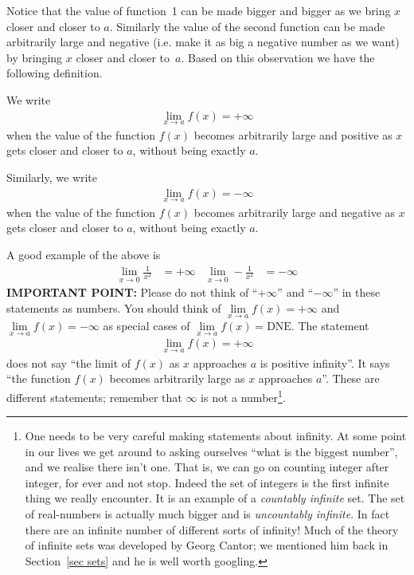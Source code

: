 Notice that the value of function~1 can be made bigger and bigger as we bring
$x$ closer and closer to $a$. Similarly the value of the second function can be
made arbitrarily large and negative (i.e. make it as big a negative number as we
want) by bringing $x$ closer and closer to~$a$. Based on this observation we
have the following definition.
\begin{defn}
\label{def lim is inf informal}
  We write
 \begin{align*}
  \lim_{x \to a} f(x) = + \infty
 \end{align*}
  when the value of the function $f(x)$ becomes arbitrarily large and
  positive as $x$ gets closer and closer to $a$, without being exactly $a$.

  Similarly, we write
 \begin{align*}
  \lim_{x \to a} f(x) = - \infty
 \end{align*}
  when the value of the function $f(x)$ becomes arbitrarily large and
  negative as $x$ gets closer and closer to $a$, without being exactly $a$.
\end{defn}
A good example of the above is
\begin{align*}
  \lim_{x \to 0} \frac{1}{x^2} &= +\infty
  & \lim_{x \to 0} -\frac{1}{x^2} &= -\infty
\end{align*}
\textbf{IMPORTANT POINT: } Please do not think of ``$+\infty$'' and ``$-\infty$''
in these statements as numbers. You should think of $\lim\limits_{x\rightarrow a} f(x) = +\infty$ and $\lim\limits_{x\rightarrow a} f(x) = -\infty$
as special cases of  $\lim\limits_{x\rightarrow a} f(x) = \text{DNE}$. The statement
\begin{align*}
  \lim_{x \to a} f(x) = +\infty
\end{align*}
does not say ``the limit of $f(x)$ as $x$ approaches $a$ is positive infinity''.
It says ``the function $f(x)$ becomes arbitrarily large as $x$ approaches $a$''.
These are different statements; remember that $\infty$ is not a
number\footnote{One needs to be very careful making statements about
infinity. At some point in our lives we get around to asking ourselves ``what
is the biggest number'', and we realise there isn't one. That is, we can go on
counting integer after integer, for ever and not stop. Indeed the set of
integers is the first infinite thing we really encounter. It is an example of a
\emph{countably infinite} set. The set of real-numbers is actually much bigger
and is \emph{uncountably infinite}. In fact there are an infinite number of
different sorts of infinity! Much of the theory of infinite sets was
developed by Georg Cantor; we mentioned him back in Section~\ref{sec sets} and he is well
worth googling.}.



